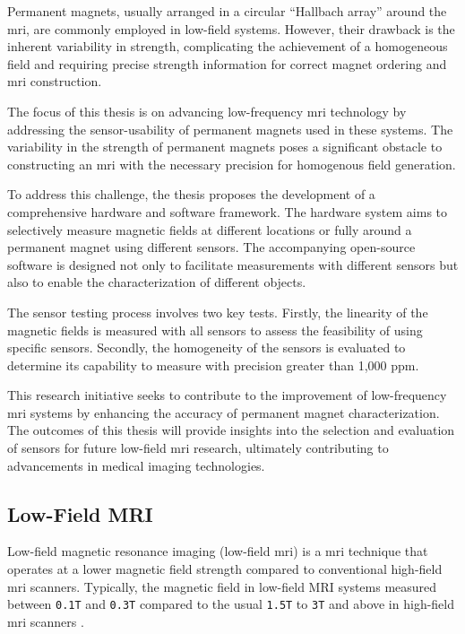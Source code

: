 Permanent magnets, usually arranged in a circular ``Hallbach array''
around the \gls{mri}, are commonly employed in low-field systems.
However, their drawback is the inherent variability in strength,
complicating the achievement of a homogeneous field and requiring
precise strength information for correct magnet ordering and \gls{mri}
construction.

The focus of this thesis is on advancing low-frequency \gls{mri}
technology by addressing the sensor-usability of permanent magnets used
in these systems. The variability in the strength of permanent magnets
poses a significant obstacle to constructing an \gls{mri} with the
necessary precision for homogenous field generation.

To address this challenge, the thesis proposes the development of a
comprehensive hardware and software framework. The hardware system aims
to selectively measure magnetic fields at different locations or fully
around a permanent magnet using different sensors. The accompanying
open-source software is designed not only to facilitate measurements
with different sensors but also to enable the characterization of
different objects.

The sensor testing process involves two key tests. Firstly, the
linearity of the magnetic fields is measured with all sensors to assess
the feasibility of using specific sensors. Secondly, the homogeneity of
the sensors is evaluated to determine its capability to measure with
precision greater than 1,000 \gls{ppm}.

This research initiative seeks to contribute to the improvement of
low-frequency \gls{mri} systems by enhancing the accuracy of permanent
magnet characterization. The outcomes of this thesis will provide
insights into the selection and evaluation of sensors for future
low-field \gls{mri} research, ultimately contributing to advancements in
medical imaging technologies.

\hypertarget{low-field-mri}{%
\subsection{Low-Field MRI}\label{low-field-mri}}

Low-field magnetic resonance imaging (low-field \gls{mri}) is a
\gls{mri} technique that operates at a lower magnetic field strength
compared to conventional high-field \gls{mri} scanners. Typically, the
magnetic field in low-field MRI systems measured between
\passthrough{\lstinline!0.1T!} and \passthrough{\lstinline!0.3T!}
compared to the usual \passthrough{\lstinline!1.5T!} to
\passthrough{\lstinline!3T!} and above in high-field \gls{mri} scanners
\cite{Hori2021-pt}.

